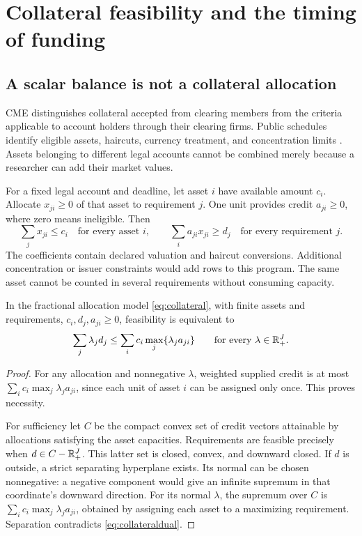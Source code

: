 \section{Collateral feasibility and the timing of funding}
\label{sec:funding}

\subsection{A scalar balance is not a collateral allocation}

CME distinguishes collateral accepted from clearing members from the criteria applicable to account holders through their clearing firms. Public schedules identify eligible assets, haircuts, currency treatment, and concentration limits \citep{CMECollateral,CMEAcceptable}. Assets belonging to different legal accounts cannot be combined merely because a researcher can add their market values.

For a fixed legal account and deadline, let asset $i$ have available amount $c_i$. Allocate $x_{ji}\ge0$ of that asset to requirement $j$. One unit provides credit $a_{ji}\ge0$, where zero means ineligible. Then
\begin{equation}
 \sum_jx_{ji}\le c_i\quad\text{for every asset }i,
 \qquad \sum_i a_{ji}x_{ji}\ge d_j\quad\text{for every requirement }j.
\label{eq:collateral}
\end{equation}
The coefficients contain declared valuation and haircut conversions. Additional concentration or issuer constraints would add rows to this program. The same asset cannot be counted in several requirements without consuming capacity.

\begin{proposition}\label{prop:collateral}
In the fractional allocation model \eqref{eq:collateral}, with finite assets and requirements, $c_i,d_j,a_{ji}\ge0$, feasibility is equivalent to
\begin{equation}
 \sum_j\lambda_jd_j
 \le\sum_ic_i\max_j\{\lambda_ja_{ji}\}
 \qquad\text{for every }\lambda\in\mathbb R_+^J.
\label{eq:collateraldual}
\end{equation}
\end{proposition}
\begin{proof}
For any allocation and nonnegative $\lambda$, weighted supplied credit is at most $\sum_ic_i\max_j\lambda_ja_{ji}$, since each unit of asset $i$ can be assigned only once. This proves necessity.

For sufficiency let $C$ be the compact convex set of credit vectors attainable by allocations satisfying the asset capacities. Requirements are feasible precisely when $d\in C-\mathbb R_+^J$. This latter set is closed, convex, and downward closed. If $d$ is outside, a strict separating hyperplane exists. Its normal can be chosen nonnegative: a negative component would give an infinite supremum in that coordinate's downward direction. For its normal $\lambda$, the supremum over $C$ is $\sum_ic_i\max_j\lambda_ja_{ji}$, obtained by assigning each asset to a maximizing requirement. Separation contradicts \eqref{eq:collateraldual}.
\end{proof}

